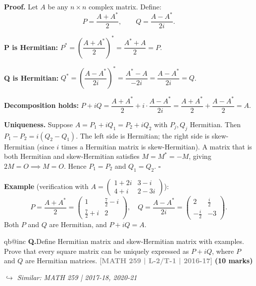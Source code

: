 \documentclass[12pt,a3paper]{article}
\makeatletter
\newcommand{\yr}[1]{\hfill\textcolor{gray}{\small\textbf{[#1]}}}
\newcommand{\mk}[1]{\textcolor{orange!70!black}{\small\textbf{(#1 marks)}}}
\newcommand{\variant}[1]{\par\vspace{1pt}\textcolor{blue!50!black}%
  {\footnotesize\textit{$\hookrightarrow$ Similar: #1}}}
\newcounter{qnum}
\newcommand{\Q}[1]{%
  \csname qb@inc\endcsname
  \needspace{4\baselineskip}
  \refstepcounter{qnum}
  \vspace{6pt}
  \noindent\textbf{Q\theqnum.}\enspace #1\par
}
\makeatother
\begin{document}
\begin{tcolorbox}[enhanced,breakable,
  colback=cG!4,colframe=cG,boxrule=0.8pt,arc=5pt,
  title={\textbf{Answer --- Every Square Matrix $= P + iQ$, $P$ and $Q$ Hermitian}},
  fonttitle=\bfseries\color{white},colbacktitle=cG]
 
\textbf{Proof.} Let $A$ be any $n\times n$ complex matrix. Define:
\[
P = \frac{A + A^*}{2}, \qquad Q = \frac{A - A^*}{2i}.
\]
 
\textbf{P is Hermitian:}
$P^* = \left(\dfrac{A+A^*}{2}\right)^* = \dfrac{A^* + A}{2} = P$. \checkmark
 
\textbf{Q is Hermitian:}
$Q^* = \left(\dfrac{A-A^*}{2i}\right)^* = \dfrac{A^* - A}{-2i} = \dfrac{A-A^*}{2i} = Q$. \checkmark
 
\textbf{Decomposition holds:}
$P + iQ = \dfrac{A+A^*}{2} + i\cdot\dfrac{A-A^*}{2i} = \dfrac{A+A^*}{2} + \dfrac{A-A^*}{2} = A$. \checkmark
 
\medskip
\textbf{Uniqueness.} Suppose $A = P_1 + iQ_1 = P_2 + iQ_2$ with $P_j,Q_j$ Hermitian.
Then $P_1 - P_2 = i(Q_2 - Q_1)$.
The left side is Hermitian; the right side is skew-Hermitian (since $i$ times a Hermitian matrix is skew-Hermitian).
A matrix that is both Hermitian and skew-Hermitian satisfies $M = M^* = -M$, giving $2M=O \implies M=O$.
Hence $P_1 = P_2$ and $Q_1 = Q_2$. \hfill$\square$
 
\medskip
\textbf{Example} (verification with $A = \begin{pmatrix}1+2i&3-i\\4+i&2-3i\end{pmatrix}$):
\[
P = \frac{A+A^*}{2} = \begin{pmatrix}1&\frac{7}{2}-i\\\frac{7}{2}+i&2\end{pmatrix},\quad
Q = \frac{A-A^*}{2i} = \begin{pmatrix}2&\frac{i}{2}\\-\frac{i}{2}&-3\end{pmatrix}.
\]
Both $P$ and $Q$ are Hermitian, and $P+iQ = A$. \checkmark
 
\end{tcolorbox}
 

\Q{Define Hermitian matrix and skew-Hermitian matrix with examples. Prove that every square matrix can be uniquely expressed as $P + iQ$, where $P$ and $Q$ are Hermitian matrices.
\yr{MATH 259 | L-2/T-1 | 2016-17} \mk{10}
\variant{MATH 259 | 2017-18, 2020-21}}
\end{document}

